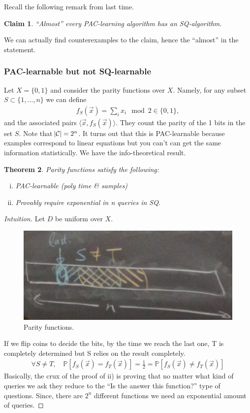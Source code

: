 \documentclass[12pt, letterpaper]{article}
\numberwithin{equation}{section} %
\newcommand{\mb}{\mathbb}
\newcommand{\mc}{\mathcal}
\newtheorem{theorem}{Theorem}[section]
\newtheorem{claim}[theorem]{Claim}
\theoremstyle{definition}
\theoremstyle{remark}
\begin{document}
Recall the following remark from last time.
\begin{claim}
``Almost'' every PAC-learning algorithm has an SQ-algorithm.
\end{claim}

We can actually find counterexamples to the claim, hence the ``almost'' in the statement.
\subsubsection{PAC-learnable but not SQ-learnable}
Let $X=\lbrace 0,1 \rbrace$ and consider the parity functions over $X$. Namely, for any subset $S\subset \lbrace 1,\ldots, n\rbrace$ we can define
\begin{align}
f_S(\vec x) = \sum_ix_i \mod 2 \in \lbrace 0, 1\rbrace,
\end{align}
and the associated pairs $\langle \vec x, f_S(\vec x)\rangle$. They count the parity of the 1 bits in the set $S$. Note that $\abs{\mc C} = 2^n$. It turns out that this is PAC-learnable because examples correspond to linear equations but you can't can get the same information statistically. We have the info-theoretical result.
\begin{theorem}
Parity functions satisfy the following:
\begin{enumerate}[i)]
\item PAC-learnable (poly time \& samples)
\item Provably require exponential in n queries in SQ.
\end{enumerate}
\end{theorem}
\begin{proof}[Intuition]
Let $D$ be uniform over $X$.
\begin{figure}[H]
\centering
\includegraphics[width=0.6\linewidth]{img/parity.jpg}
\caption{Parity functions.}
\end{figure}
If we flip coins to decide the bits, by the time we reach the last one, T is completely determined but S relies on the result completely. 
\begin{align}
\forall S\ne T,\quad\mb P[f_S(\vec x) = f_T(\vec x)] = \frac 12 = \mb P[f_S(\vec x) \ne f_T(\vec x)]
\end{align}
Basically, the crux of the proof of ii) is proving that no matter what kind of queries we ask they reduce to the ``Is the answer this function?'' type of questions. Since, there are $2^n$ different functions we need an exponential amount of queries.
\end{proof}
\end{document}
